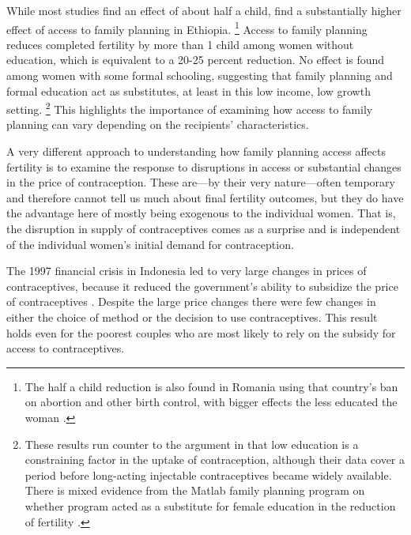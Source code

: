 \documentclass[letterpaper,12pt]{article}
\begin{document}
While most studies find an effect of about half a child,
\citet{Portner2011} find a substantially higher effect of access to
family planning in Ethiopia.%
\footnote{
The half a child reduction is also found in Romania using that country's
ban on abortion and other birth control, with bigger effects the less
educated the woman \citep{Pop-Eleches2010}.
}
Access to family planning reduces completed fertility by more than 1
child among women without education, which is equivalent to a 20-25
percent reduction.
No effect is found among women with some formal schooling, suggesting
that family planning and formal education act as substitutes, at least
in this low income, low growth setting.%
\footnote{
These results run counter to the argument in \citet{Feyisetan1996} that
low education is a constraining factor in the uptake of contraception,
although their data cover a period before long-acting injectable
contraceptives became widely available.
There is mixed evidence from the Matlab family planning program on
whether program acted as a substitute for female education in the
reduction of fertility \citep{Sinha2005,Joshi2007}.}
This highlights the importance of examining how access to family planning
can vary depending on the recipients' characteristics.

A very different approach to understanding how family planning access
affects fertility is to examine the response to disruptions in access or
substantial changes in the price of contraception.
These are---by their very nature---often temporary and therefore cannot
tell us much about final fertility outcomes, but they do have the
advantage here of mostly being exogenous to the individual women.
That is, the disruption in supply of contraceptives comes as a surprise
and is independent of the individual women's initial demand for
contraception.

The 1997 financial crisis in Indonesia led to very large changes in
prices of contraceptives, because it reduced the government's ability to
subsidize the price of contraceptives \citep{McKelvey2012}.
Despite the large price changes there were few changes in either the
choice of method or the decision to use contraceptives.
This result holds even for the poorest couples who are most likely to
rely on the subsidy for access to contraceptives.
\end{document}
